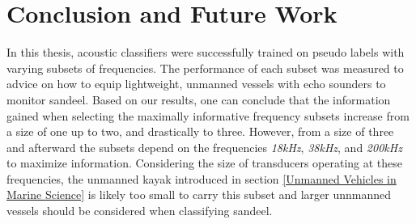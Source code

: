 \chapter{Conclusion and Future Work}
    In this thesis, acoustic classifiers were successfully trained on pseudo labels with varying subsets of frequencies. The performance of each subset was measured to advice on how to equip lightweight, unmanned vessels with echo sounders to monitor sandeel. Based on our results, one can conclude that the information gained when selecting the maximally informative frequency subsets increase from a size of one up to two, and drastically to three. However, from a size of three and afterward the subsets depend on the frequencies \textit{18kHz}, \textit{38kHz}, and \textit{200kHz} to maximize information. Considering the size of transducers operating at these frequencies, the unmanned kayak introduced in section \ref{Unmanned Vehicles in Marine Science} is likely too small to carry this subset and larger unnmanned vessels should be considered when classifying sandeel.
    
    
    


